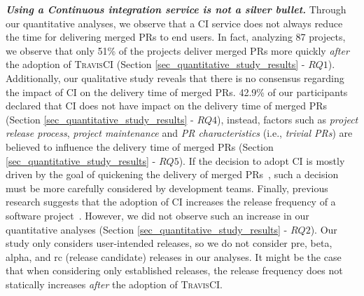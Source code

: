 {\em\bfseries Using a Continuous integration service is not a silver bullet.} Through our
quantitative analyses, we observe that a CI service does not always
reduce the time for delivering merged PRs 
to end users. In fact, analyzing 87 projects, we observe that
only 51\% of the projects deliver merged PRs more quickly \textit{after} the adoption of \textsc{TravisCI} (Section \ref{sec_quantitative_study_results} - $RQ1$). 
Additionally, our qualitative study reveals that there is no consensus regarding the impact of CI on the delivery time of merged PRs.
42.9\% of our participants declared that CI does not have impact on the delivery time of merged PRs (Section \ref{sec_quantitative_study_results} - $RQ4$), instead, factors such as \textit{project release process}, \textit{project maintenance} and \textit{PR characteristics} (i.e., \textit{trivial PRs}) are believed to influence the delivery time of merged PRs (Section \ref{sec_quantitative_study_results} - $RQ5$). 
If the decision to adopt CI is mostly driven by the goal of quickening the
delivery of merged PRs~\citep{Laukkanen2015-ab}, such a decision must be more
carefully considered by development teams. Finally, previous research suggests
that the adoption of CI increases the release frequency of a software
project~\cite{Hilton2016-xy}. However, we did not observe such an increase in
our quantitative analyses (Section \ref{sec_quantitative_study_results} - $RQ2$). Our study only considers user-intended releases, so we do not consider pre, beta, alpha, and rc (release candidate) releases in our analyses. It might be the case that when considering only established releases, the release frequency does not statically increases \textit{after} the adoption of \textsc{TravisCI}.

